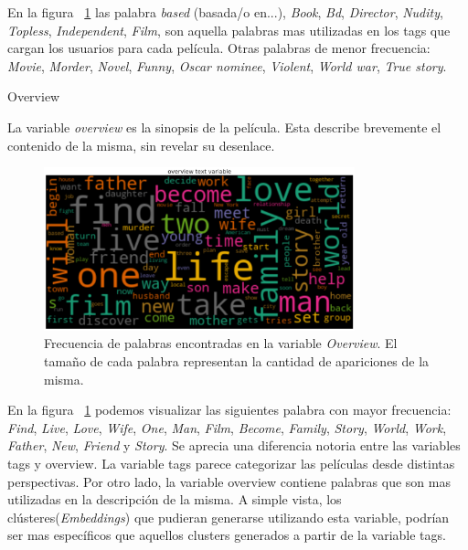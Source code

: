 \documentclass[11pt,a4paper,twoside]{thesis}
\begin{document}
En la figura ~\ref{fig:tagsCloud} las palabra \textit{based} (basada/o en...), \textit{Book}, \textit{Bd}, \textit{Director}, \textit{Nudity}, \textit{Topless}, \textit{Independent}, \textit{Film}, son aquella palabras mas utilizadas en los tags que cargan los usuarios para cada película. Otras palabras de menor frecuencia: \textit{Movie}, \textit{Morder}, \textit{Novel}, \textit{Funny}, \textit{Oscar nominee}, \textit{Violent}, \textit{World war}, \textit{True story}.


\clearpage

\begin{description}
	\item[Overview]
\end{description}

La variable \textit{overview} es la sinopsis de la película. Esta describe brevemente el contenido de la misma, sin revelar su desenlace.

\begin{figure}[h!]
	\centering
	\includegraphics[width=9cm]{./images/Cloud-Overview.png}
	\caption{Frecuencia de palabras encontradas en la variable \textit{Overview}. El tamaño de cada palabra representan la cantidad de apariciones de la misma.}
	\label{fig:tagsCloud}
\end{figure}	


En la figura ~\ref{fig:tagsCloud} podemos visualizar las siguientes palabra con mayor frecuencia: \textit{Find}, \textit{Live}, \textit{Love}, \textit{Wife}, \textit{One}, \textit{Man}, \textit{Film}, \textit{Become}, \textit{Family}, \textit{Story}, \textit{World}, \textit{Work}, \textit{Father}, \textit{New}, \textit{Friend} y \textit{Story}. Se aprecia una diferencia notoria entre las variables tags y overview. La variable tags parece categorizar las películas desde distintas perspectivas. Por otro lado, la variable overview contiene palabras que son mas utilizadas en la descripción de la misma. A simple vista, los clústeres(\textit{Embeddings}) que pudieran generarse utilizando esta variable, podrían ser mas específicos que aquellos clusters generados a partir de la variable tags.
\end{document}
